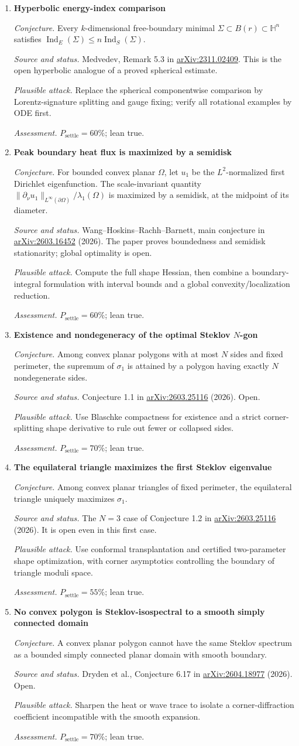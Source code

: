 \documentclass[11pt]{article}
\newcommand{\cand}[5]{%
  \item \textbf{#1}\par
  \emph{Conjecture.} #2\par
  \emph{Source and status.} #3\par
  \emph{Plausible attack.} #4\par
  \emph{Assessment.} #5
}
\newcommand{\psettle}{P_{\mathrm{settle}}}
\begin{document}
\begin{enumerate}[label=\textbf{L\arabic*.}]
\cand{Hyperbolic energy-index comparison}
{Every $k$-dimensional free-boundary minimal $\Sigma\subset B(r)\subset\mathbb H^n$ satisfies $\operatorname{Ind}_E(\Sigma)\le n\operatorname{Ind}_S(\Sigma)$.}
{Medvedev, Remark 5.3 in \href{https://arxiv.org/abs/2311.02409}{arXiv:2311.02409}.  This is the open hyperbolic analogue of a proved spherical estimate.}
{Replace the spherical componentwise comparison by Lorentz-signature splitting and gauge fixing; verify all rotational examples by ODE first.}
{$\psettle=60\%$; lean true.}

\cand{Peak boundary heat flux is maximized by a semidisk}
{For bounded convex planar $\Omega$, let $u_1$ be the $L^2$-normalized first Dirichlet eigenfunction.  The scale-invariant quantity $\|\partial_\nu u_1\|_{L^\infty(\partial\Omega)}/\lambda_1(\Omega)$ is maximized by a semidisk, at the midpoint of its diameter.}
{Wang--Hoskins--Rachh--Barnett, main conjecture in \href{https://arxiv.org/abs/2603.16452}{arXiv:2603.16452} (2026).  The paper proves boundedness and semidisk stationarity; global optimality is open.}
{Compute the full shape Hessian, then combine a boundary-integral formulation with interval bounds and a global convexity/localization reduction.}
{$\psettle=60\%$; lean true.}

\cand{Existence and nondegeneracy of the optimal Steklov $N$-gon}
{Among convex planar polygons with at most $N$ sides and fixed perimeter, the supremum of $\sigma_1$ is attained by a polygon having exactly $N$ nondegenerate sides.}
{Conjecture 1.1 in \href{https://arxiv.org/html/2603.25116}{arXiv:2603.25116} (2026).  Open.}
{Use Blaschke compactness for existence and a strict corner-splitting shape derivative to rule out fewer or collapsed sides.}
{$\psettle=70\%$; lean true.}

\cand{The equilateral triangle maximizes the first Steklov eigenvalue}
{Among convex planar triangles of fixed perimeter, the equilateral triangle uniquely maximizes $\sigma_1$.}
{The $N=3$ case of Conjecture 1.2 in \href{https://arxiv.org/html/2603.25116}{arXiv:2603.25116} (2026).  It is open even in this first case.}
{Use conformal transplantation and certified two-parameter shape optimization, with corner asymptotics controlling the boundary of triangle moduli space.}
{$\psettle=55\%$; lean true.}

\cand{No convex polygon is Steklov-isospectral to a smooth simply connected domain}
{A convex planar polygon cannot have the same Steklov spectrum as a bounded simply connected planar domain with smooth boundary.}
{Dryden et al., Conjecture 6.17 in \href{https://arxiv.org/html/2604.18977}{arXiv:2604.18977} (2026).  Open.}
{Sharpen the heat or wave trace to isolate a corner-diffraction coefficient incompatible with the smooth expansion.}
{$\psettle=70\%$; lean true.}


\end{enumerate}
\end{document}
